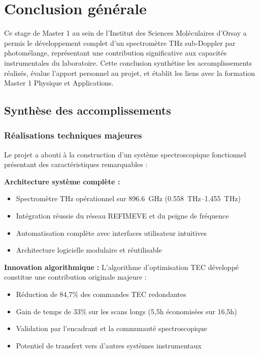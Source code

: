 
\chapter{Conclusion générale}
\label{chap:conclusion}

Ce stage de Master 1 au sein de l'Institut des Sciences Moléculaires d'Orsay a permis le développement complet d'un spectromètre THz sub-Doppler par photomélange, représentant une contribution significative aux capacités instrumentales du laboratoire. Cette conclusion synthétise les accomplissements réalisés, évalue l'apport personnel au projet, et établit les liens avec la formation Master 1 Physique et Applications.

\section{Synthèse des accomplissements}

\subsection{Réalisations techniques majeures}

Le projet a abouti à la construction d'un système spectroscopique fonctionnel présentant des caractéristiques remarquables :

\textbf{Architecture système complète :}
\begin{itemize}
    \item Spectromètre THz opérationnel sur \SI{896.6}{\GHz} (\SIrange{0.558}{1.455}{\THz})
    \item Intégration réussie du réseau REFIMEVE et du peigne de fréquence
    \item Automatisation complète avec interfaces utilisateur intuitives
    \item Architecture logicielle modulaire et réutilisable
\end{itemize}

\textbf{Innovation algorithmique :}
L'algorithme d'optimisation TEC développé constitue une contribution originale majeure :
\begin{itemize}
    \item Réduction de 84,7\% des commandes TEC redondantes
    \item Gain de temps de 33\% sur les scans longs (5,5h économisées sur 16,5h)
    \item Validation par l'encadrant et la communauté spectroscopique
    \item Potentiel de transfert vers d'autres systèmes instrumentaux
\end{itemize}

